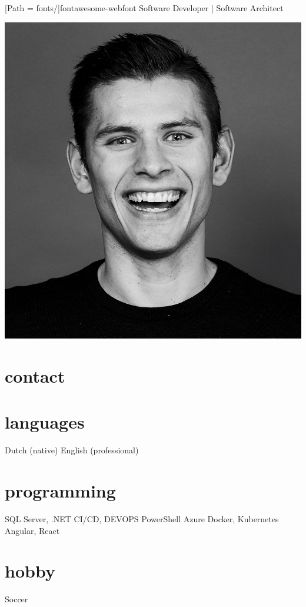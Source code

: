 \documentclass[]{friggeri-cv}
\begin{document}
\newfontfamily{\FA}[Path = fonts/]{fontawesome-webfont}
       {Software Developer | Software Architect}

\begin{aside}
  \includegraphics[width=\textwidth]{profilePicture.jpg}
  \section{contact}
    \href{https://www.google.com/maps/place/Tilburg/@51.5737217,4.9686496,12z}{{\FA \faMapMarker}}
    \href{mailto:pietervdheijden@gmail.com}{{\FA \faEnvelope}}
    \href{https://linkedin.com/in/pietervdheijden}{{\FA \faLinkedin}}
    \href{https://github.com/pietervdheijden}{{\FA \faGithub}}
  \section{languages}
    Dutch (native)
    English (professional)
  \section{programming}
    {SQL Server, .NET}
    {CI/CD, DEVOPS}
    {PowerShell}
    {Azure}
    {Docker, Kubernetes}
    {Angular, React}
  \section{hobby}
    Soccer
\end{aside}
\end{document}
